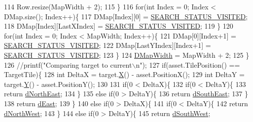 \begin{DoxyCode}
114             Row.resize(MapWidth + 2);   
115         \}
116         \textcolor{keywordflow}{for}(\textcolor{keywordtype}{int} Index = 0; Index < DMap.size(); Index++)\{
117             DMap[Index][0] = \hyperlink{RouterMap_8cpp_ae8b1ae5dd44be7811fb48e54c1194503}{SEARCH\_STATUS\_VISITED};
118             DMap[Index][LastXIndex] = \hyperlink{RouterMap_8cpp_ae8b1ae5dd44be7811fb48e54c1194503}{SEARCH\_STATUS\_VISITED}; 
119         \}
120         \textcolor{keywordflow}{for}(\textcolor{keywordtype}{int} Index = 0; Index < MapWidth; Index++)\{
121             DMap[0][Index+1] = \hyperlink{RouterMap_8cpp_ae8b1ae5dd44be7811fb48e54c1194503}{SEARCH\_STATUS\_VISITED};
122             DMap[LastYIndex][Index+1] = \hyperlink{RouterMap_8cpp_ae8b1ae5dd44be7811fb48e54c1194503}{SEARCH\_STATUS\_VISITED};
123         \}
124         \hyperlink{classCRouterMap_a9899b7a017d376a16af153f6f91159d3}{DMapWidth} = MapWidth + 2;
125     \}
126     \textcolor{comment}{//printf("Comparing target to current\(\backslash\)n");}
127     \textcolor{keywordflow}{if}(asset.TilePosition() == TargetTile)\{
128         \textcolor{keywordtype}{int} DeltaX = target.\hyperlink{classCPosition_a9a6b94d3b91df1492d166d9964c865fc}{X}() - asset.PositionX();
129         \textcolor{keywordtype}{int} DeltaY = target.\hyperlink{classCPosition_a1aa8a30e2f08dda1f797736ba8c13a87}{Y}() - asset.PositionY();
130         
131         \textcolor{keywordflow}{if}(0 < DeltaX)\{
132             \textcolor{keywordflow}{if}(0 < DeltaY)\{
133                 \textcolor{keywordflow}{return} \hyperlink{GameDataTypes_8h_acb2b033915f6659a71a38b5aa6e4eb42a27d1b6db9b056b1c0d42dce9c259bfc5}{dNorthEast};
134             \}
135             \textcolor{keywordflow}{else} \textcolor{keywordflow}{if}(0 > DeltaY)\{
136                 \textcolor{keywordflow}{return} \hyperlink{GameDataTypes_8h_acb2b033915f6659a71a38b5aa6e4eb42a44067bc8d66314648f9abcafd594743b}{dSouthEast};
137             \}
138             \textcolor{keywordflow}{return} \hyperlink{GameDataTypes_8h_acb2b033915f6659a71a38b5aa6e4eb42a06b098879996cb811972f1fb43f11e55}{dEast};
139         \}
140         \textcolor{keywordflow}{else} \textcolor{keywordflow}{if}(0 > DeltaX)\{
141             \textcolor{keywordflow}{if}(0 < DeltaY)\{
142                 \textcolor{keywordflow}{return} \hyperlink{GameDataTypes_8h_acb2b033915f6659a71a38b5aa6e4eb42a005e8358dded5729dae6ca3c8cf98898}{dNorthWest};
143             \}
144             \textcolor{keywordflow}{else} \textcolor{keywordflow}{if}(0 > DeltaY)\{
145                 \textcolor{keywordflow}{return} \hyperlink{GameDataTypes_8h_acb2b033915f6659a71a38b5aa6e4eb42aff3cf1f87f6003fab2e8fc616500345b}{dSouthWest};

\end{DoxyCode}
